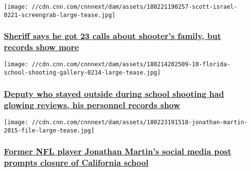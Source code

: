 \href{/2018/02/27/us/parkland-shooter-cruz-sheriff-calls-invs/index.html}{}

\texttt{[image: //cdn.cnn.com/cnnnext/dam/assets/180221190257-scott-israel-0221-screengrab-large-tease.jpg]}

\hypertarget{sheriff-says-he-got-23-calls-about-shooters-family-but-records-show-more}{%
\subsubsection{\texorpdfstring{\href{/2018/02/27/us/parkland-shooter-cruz-sheriff-calls-invs/index.html}{Sheriff
says he got 23 calls about shooter's family, but records show
more}}{Sheriff says he got 23 calls about shooter's family, but records show more}}\label{sheriff-says-he-got-23-calls-about-shooters-family-but-records-show-more}}

\href{/2018/02/23/us/school-resource-officer-reviews-invs/index.html}{}

\texttt{[image: //cdn.cnn.com/cnnnext/dam/assets/180214202509-10-florida-school-shooting-gallery-0214-large-tease.jpg]}

\hypertarget{deputy-who-stayed-outside-during-school-shooting-had-glowing-reviews-his-personnel-records-show}{%
\subsubsection{\texorpdfstring{\href{/2018/02/23/us/school-resource-officer-reviews-invs/index.html}{Deputy
who stayed outside during school shooting had glowing reviews, his
personnel records
show}}{Deputy who stayed outside during school shooting had glowing reviews, his personnel records show}}\label{deputy-who-stayed-outside-during-school-shooting-had-glowing-reviews-his-personnel-records-show}}

\href{/2018/02/23/us/jonathan-martin-harvard-westlake/index.html}{}

\texttt{[image: //cdn.cnn.com/cnnnext/dam/assets/180223191518-jonathan-martin-2015-file-large-tease.jpg]}

\hypertarget{former-nfl-player-jonathan-martins-social-media-post-prompts-closure-of-california-school}{%
\subsubsection{\texorpdfstring{\href{/2018/02/23/us/jonathan-martin-harvard-westlake/index.html}{Former
NFL player Jonathan Martin's social media post prompts closure of
California
school}}{Former NFL player Jonathan Martin's social media post prompts closure of California school}}\label{former-nfl-player-jonathan-martins-social-media-post-prompts-closure-of-california-school}}

